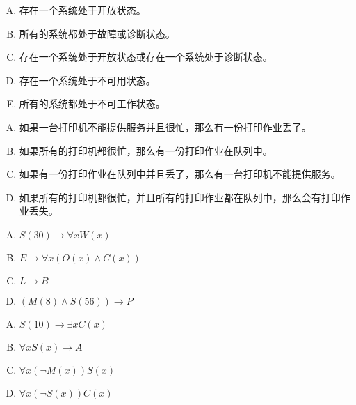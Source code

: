 {{        %
        \begin{practices}
            \begin{enumerate}[A.]
                \item 存在一个系统处于开放状态。
                \item 所有的系统都处于故障或诊断状态。
                \item 存在一个系统处于开放状态或存在一个系统处于诊断状态。
                \item 存在一个系统处于不可用状态。
                \item 所有的系统都处于不可工作状态。
            \end{enumerate}
        \end{practices}

        \begin{practices}
            \begin{enumerate}[A.]
                \item 如果一台打印机不能提供服务并且很忙，那么有一份打印作业丢了。
                \item 如果所有的打印机都很忙，那么有一份打印作业在队列中。
                \item 如果有一份打印作业在队列中并且丢了，那么有一台打印机不能提供服务。
                \item 如果所有的打印机都很忙，并且所有的打印作业都在队列中，那么会有打印作业丢失。
            \end{enumerate}
        \end{practices}

        \begin{practices}
            \begin{enumerate}[A.]
                \item $S(30) \rightarrow \forall x W(x)$
                \item $E \rightarrow \forall x (O(x) \wedge C(x))$
                \item $L \rightarrow B$
                \item $(M(8) \wedge S(56)) \rightarrow P$
            \end{enumerate}
        \end{practices}

        \begin{practices}
            \begin{enumerate}[A.]
                \item $S(10) \rightarrow \exists x C(x)$
                \item $\forall x S(x) \rightarrow A$
                \item $\forall x(\neg M(x)) S(x)$
                \item $\forall x(\neg S(x)) C(x)$
            \end{enumerate}
        \end{practices}

}}
